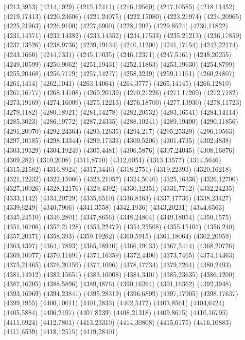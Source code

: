 (4213,3953)
(4214,1929)
(4215,12411)
(4216,19560)
(4217,10585)
(4218,11452)
(4219,17413)
(4220,23606)
(4221,24075)
(4222,15080)
(4223,21974)
(4224,20965)
(4225,21963)
(4226,9100)
(4227,6900)
(4228,1202)
(4229,8524)
(4230,11822)
(4231,14371)
(4232,14382)
(4233,14352)
(4234,17533)
(4235,21213)
(4236,17850)
(4237,13526)
(4238,9736)
(4239,19134)
(4240,11200)
(4241,17154)
(4242,22174)
(4243,1660)
(4244,7331)
(4245,17035)
(4246,12371)
(4247,5161)
(4248,20255)
(4249,10599)
(4250,9062)
(4251,19431)
(4252,11863)
(4253,19630)
(4254,8799)
(4255,20468)
(4256,7179)
(4257,14277)
(4258,3239)
(4259,11161)
(4260,24807)
(4261,1414)
(4262,1041)
(4263,14064)
(4264,3777)
(4265,14145)
(4266,12810)
(4267,16777)
(4268,14708)
(4269,20139)
(4270,21226)
(4271,17209)
(4272,7182)
(4273,19169)
(4274,16009)
(4275,12213)
(4276,18700)
(4277,13930)
(4278,11723)
(4279,1182)
(4280,18921)
(4281,14278)
(4282,20532)
(4283,16541)
(4284,14114)
(4285,3023)
(4286,19772)
(4287,24335)
(4288,10241)
(4289,19490)
(4290,11856)
(4291,20070)
(4292,24364)
(4293,12635)
(4294,217)
(4295,25329)
(4296,10563)
(4297,10185)
(4298,13344)
(4299,17333)
(4300,5206)
(4301,4735)
(4302,4838)
(4303,19329)
(4304,19249)
(4305,4481)
(4306,5876)
(4307,24045)
(4308,16876)
(4309,282)
(4310,2008)
(4311,8710)
(4312,6054)
(4313,13577)
(4314,5646)
(4315,21582)
(4316,8924)
(4317,3446)
(4318,2751)
(4319,22393)
(4320,16218)
(4321,12232)
(4322,15060)
(4323,21057)
(4324,5040)
(4325,16336)
(4326,12700)
(4327,10026)
(4328,12176)
(4329,4392)
(4330,12351)
(4331,7712)
(4332,24235)
(4333,1142)
(4334,20729)
(4335,6510)
(4336,8163)
(4337,17736)
(4338,23427)
(4339,6249)
(4340,7906)
(4341,3558)
(4342,1936)
(4343,20231)
(4344,6563)
(4345,24510)
(4346,2801)
(4347,8656)
(4348,24804)
(4349,18054)
(4350,1575)
(4351,16706)
(4352,21128)
(4353,22479)
(4354,25508)
(4355,15107)
(4356,240)
(4357,20371)
(4358,393)
(4359,19262)
(4360,5915)
(4361,18064)
(4362,20959)
(4363,4397)
(4364,17893)
(4365,18910)
(4366,19133)
(4367,5414)
(4368,20726)
(4369,10077)
(4370,11691)
(4371,16359)
(4372,4400)
(4373,7465)
(4374,14463)
(4375,21465)
(4376,20159)
(4377,1096)
(4378,17734)
(4379,7264)
(4380,2493)
(4381,14912)
(4382,15651)
(4383,10008)
(4384,3401)
(4385,23635)
(4386,1200)
(4387,16205)
(4388,5896)
(4389,4876)
(4390,16264)
(4391,16362)
(4392,3948)
(4393,16969)
(4394,23841)
(4395,28319)
(4396,6899)
(4397,17905)
(4398,17637)
(4399,1955)
(4400,10011)
(4401,2833)
(4402,5472)
(4403,8561)
(4404,6424)
(4405,5884)
(4406,2497)
(4407,8239)
(4408,21318)
(4409,8675)
(4410,16795)
(4411,6924)
(4412,7801)
(4413,23310)
(4414,30808)
(4415,6175)
(4416,10883)
(4417,6539)
(4418,12575)
(4419,28401)
